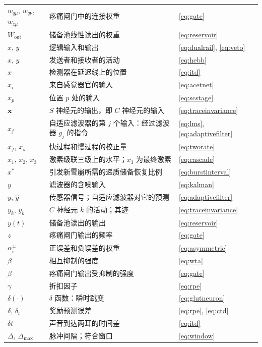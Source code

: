 \begin{center}
\begin{longtable}{>{\raggedright}p{2.0cm}>{\raggedright}p{9.6cm}>{\raggedright\arraybackslash}p{2.4cm}}
$w_{q\mu}$, $w_{q\nu}$, $w_{z\mu}$ & 疼痛闸门中的连接权重 & \eqref{eq:gate} \\
$W_{\text{out}}$ & 储备池线性读出的权重 & \eqref{eq:reservoir} \\
$x$, $y$ & 逻辑输入和输出 & \eqref{eq:dualrail}, \eqref{eq:veto} \\
$x$, $y$ & 发送者和接收者的活动 & \eqref{eq:hebb} \\
$x$ & 检测器在延迟线上的位置 & \eqref{eq:itd} \\
$x_i$ & 来自感觉器官的输入 & \eqref{eq:acetnet} \\
$x_p$ & 位置 $p$ 处的输入 & \eqref{eq:scstage} \\
$\mathbf x$ & $S$ 神经元的输出，即 $C$ 神经元的输入 & \eqref{eq:traceinvariance} \\
$x_j$ & 自适应滤波器的第 $j$ 个输入：经过滤波器 $g_j$ 的指令 & \eqref{eq:lms}, \eqref{eq:adaptivefilter} \\
$x_f$, $x_s$ & 快过程和慢过程的校正量 & \eqref{eq:tworate} \\
$x_1$, $x_2$, $x_3$ & 激素级联三级上的水平；$x_3$ 为最终激素 & \eqref{eq:cascade} \\
$x^*$ & 引发新雪崩所需的递质储备恢复比例 & \eqref{eq:burstinterval} \\
$y$ & 滤波器的含噪输入 & \eqref{eq:kalman} \\
$y$, $\hat y$ & 传感器信号；自适应滤波器对它的预测 & \eqref{eq:adaptivefilter} \\
$y_k$, $\bar y_k$ & $C$ 神经元 $k$ 的活动；其迹 & \eqref{eq:traceinvariance} \\
$y(t)$ & 储备池读出的输出 & \eqref{eq:reservoir} \\
$z$ & 疼痛闸门输出的频率 & \eqref{eq:gate} \\
\midrule
$\alpha_i^\pm$ & 正误差和负误差的权重 & \eqref{eq:asymmetric} \\
$\beta$ & 相互抑制的强度 & \eqref{eq:wta} \\
$\beta$ & 疼痛闸门输出受抑制的强度 & \eqref{eq:gate} \\
$\gamma$ & 折扣因子 & \eqref{eq:rpe} \\
$\delta(\cdot)$ & $\delta$ 函数：瞬时跳变 & \eqref{eq:glutneuron} \\
$\delta$, $\delta_t$ & 奖励预测误差 & \eqref{eq:rpe}, \eqref{eq:ctd} \\
$\delta t$ & 声音到达两耳的时间差 & \eqref{eq:itd} \\
$\Delta$, $\Delta_{\max}$ & 脉冲间隔；符合窗口 & \eqref{eq:window} \\

\end{longtable}
\end{center}
